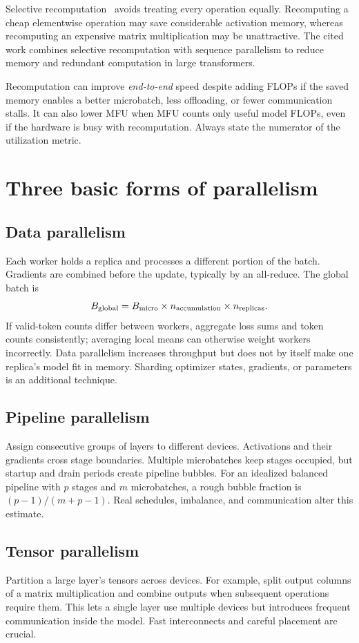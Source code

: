 Selective recomputation~\cite{selective} avoids treating every operation equally. Recomputing a cheap elementwise operation may save considerable activation memory, whereas recomputing an expensive matrix multiplication may be unattractive. The cited work combines selective recomputation with sequence parallelism to reduce memory and redundant computation in large transformers.

Recomputation can improve \emph{end-to-end} speed despite adding FLOPs if the saved memory enables a better microbatch, less offloading, or fewer communication stalls. It can also lower MFU when MFU counts only useful model FLOPs, even if the hardware is busy with recomputation. Always state the numerator of the utilization metric.

\section{Three basic forms of parallelism}
\subsection{Data parallelism}
Each worker holds a replica and processes a different portion of the batch. Gradients are combined before the update, typically by an all-reduce. The global batch is
\[
B_{\rm global}=B_{\rm micro}\times n_{\rm accumulation}\times n_{\rm replicas}.
\]
If valid-token counts differ between workers, aggregate loss sums and token counts consistently; averaging local means can otherwise weight workers incorrectly. Data parallelism increases throughput but does not by itself make one replica's model fit in memory. Sharding optimizer states, gradients, or parameters is an additional technique.

\subsection{Pipeline parallelism}
Assign consecutive groups of layers to different devices. Activations and their gradients cross stage boundaries. Multiple microbatches keep stages occupied, but startup and drain periods create pipeline bubbles. For an idealized balanced pipeline with $p$ stages and $m$ microbatches, a rough bubble fraction is $(p-1)/(m+p-1)$. Real schedules, imbalance, and communication alter this estimate.

\subsection{Tensor parallelism}
Partition a large layer's tensors across devices. For example, split output columns of a matrix multiplication and combine outputs when subsequent operations require them. This lets a single layer use multiple devices but introduces frequent communication inside the model. Fast interconnects and careful placement are crucial.

